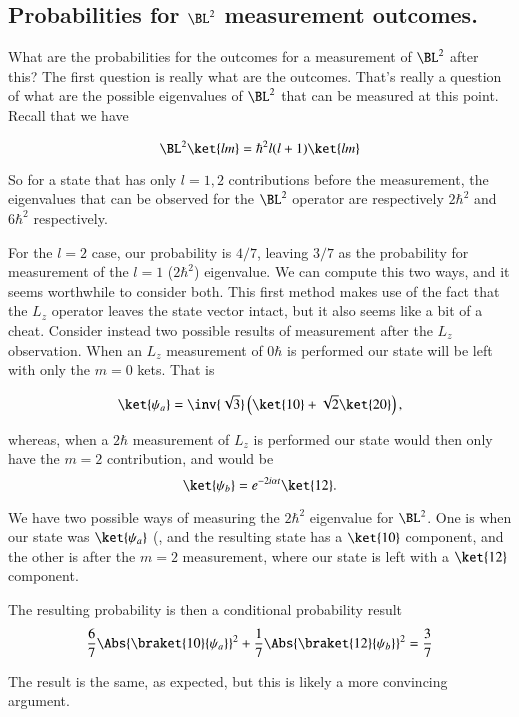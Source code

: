 \subsection{Probabilities for $\BL^2$ measurement outcomes.}

What are the probabilities for the outcomes for a measurement of $\BL^2$ after this?  The first question is really what are the outcomes.  That's really a question of what are the possible eigenvalues of $\BL^2$ that can be measured at this point.  Recall that we have

\begin{equation}\label{eqn:qmIexam2010:60}
\BL^2 \ket{l m} = \hbar^2 l (l + 1) \ket{l m}
\end{equation}

So for a state that has only $l=1,2$ contributions before the measurement, the eigenvalues that can be observed for the $\BL^2$ operator are respectively $2 \hbar^2$ and $6 \hbar^2$ respectively.

For the $l=2$ case, our probability is $4/7$, leaving $3/7$ as the probability for measurement of the $l=1$ ($2 \hbar^2$) eigenvalue.  We can compute this two ways, and it seems worthwhile to consider both.  This first method makes use of the fact that the $L_z$ operator leaves the state vector intact, but it also seems like a bit of a cheat.  Consider instead two possible results of measurement after the $L_z$ observation.  When an $L_z$ measurement of $0 \hbar$ is performed our state will be left with only the $m=0$ kets.  That is

\begin{equation}\label{eqn:qmIexam2010:70}
\ket{\psi_a} = \inv{\sqrt{3}} \left( \ket{10} + \sqrt{2} \ket{20} \right),
\end{equation}

whereas, when a $2 \hbar$ measurement of $L_z$ is performed our state would then only have the $m=2$ contribution, and would be
\begin{equation}\label{eqn:qmIexam2010:80}
\ket{\psi_b} = e^{-2 i \alpha t} \ket{12 }.
\end{equation}

We have two possible ways of measuring the $2 \hbar^2$ eigenvalue for $\BL^2$.  One is when our state was $\ket{\psi_a}$ (, and the resulting state has a $\ket{10}$ component, and the other is after the $m=2$ measurement, where our state is left with a $\ket{12}$ component.

The resulting probability is then a conditional probability result
\begin{equation}\label{eqn:qmIexam2010:n}
\frac{6}{7} \Abs{ \braket{10}{\psi_a} }^2 + \frac{1}{7} \Abs{ \braket{12 }{\psi_b}}^2 = \frac{3}{7}
\end{equation}

The result is the same, as expected, but this is likely a more convincing argument.


\EndNoBibArticle
